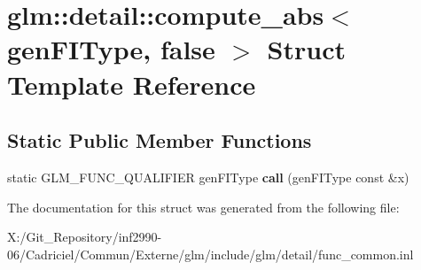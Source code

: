 \hypertarget{structglm_1_1detail_1_1compute__abs_3_01gen_f_i_type_00_01false_01_4}{\section{glm\-:\-:detail\-:\-:compute\-\_\-abs$<$ gen\-F\-I\-Type, false $>$ Struct Template Reference}
\label{structglm_1_1detail_1_1compute__abs_3_01gen_f_i_type_00_01false_01_4}
}
\subsection*{Static Public Member Functions}
\begin{DoxyCompactItemize}
\item 
\hypertarget{structglm_1_1detail_1_1compute__abs_3_01gen_f_i_type_00_01false_01_4_a0758b7608495285101dea21f0a7cc37a}{static G\-L\-M\-\_\-\-F\-U\-N\-C\-\_\-\-Q\-U\-A\-L\-I\-F\-I\-E\-R gen\-F\-I\-Type {\bfseries call} (gen\-F\-I\-Type const \&x)}\label{structglm_1_1detail_1_1compute__abs_3_01gen_f_i_type_00_01false_01_4_a0758b7608495285101dea21f0a7cc37a}

\end{DoxyCompactItemize}


The documentation for this struct was generated from the following file\-:\begin{DoxyCompactItemize}
\item 
X\-:/\-Git\-\_\-\-Repository/inf2990-\/06/\-Cadriciel/\-Commun/\-Externe/glm/include/glm/detail/func\-\_\-common.\-inl\end{DoxyCompactItemize}

